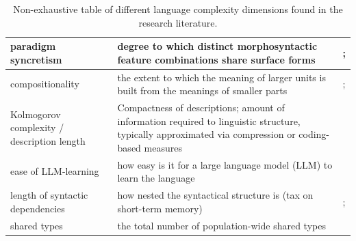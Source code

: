 \documentclass[USenglish]{article}
\providecommand{\DIFdelbegin}{} %
\providecommand{\DIFscaledelfig}{0.5}
\newlength{\DIFdelgraphicswidth} %
\newlength{\DIFdelgraphicsheight} %
\providecommand{\DIFdelincludegraphics}[2][]{%
\sbox{\DIFdelgraphicsbox}{\DIFOincludegraphics[#1]{#2}}%
\settoboxwidth{\DIFdelgraphicswidth}{\DIFdelgraphicsbox} %
\settoboxtotalheight{\DIFdelgraphicsheight}{\DIFdelgraphicsbox} %
\scalebox{\DIFscaledelfig}{%
\parbox[b]{\DIFdelgraphicswidth}{\usebox{\DIFdelgraphicsbox}\\[-\baselineskip] \rule{\DIFdelgraphicswidth}{0em}}\llap{\resizebox{\DIFdelgraphicswidth}{\DIFdelgraphicsheight}{%
\setlength{\unitlength}{\DIFdelgraphicswidth}%
\begin{picture}(1,1)%
\thicklines\linethickness{2pt} %
{\color[rgb]{1,0,0}\put(0,0){\framebox(1,1){}}}%
{\color[rgb]{1,0,0}\put(0,0){\line( 1,1){1}}}%
{\color[rgb]{1,0,0}\put(0,1){\line(1,-1){1}}}%
\end{picture}%
}\hspace*{3pt}}} %
} %
\DeclareRobustCommand{\DIFdelbegin}{\DIFOdelbegin \let\includegraphics\DIFdelincludegraphics} %
\begin{document}
\begin{table}[ht]
\begin{tabular}{p{2.2cm}p{4cm}p{6cm}}
paradigm syncretism &  degree to which distinct morphosyntactic feature combinations share surface forms & \citet{quinn_evolutionary_2025}; \citet{bonami_joint_2016}  \\    \midrule
compositionality  & the extent to which the meaning of larger units is built from the meanings of smaller parts &  \cite{wraygrace2007}; \citet{lindsay-smith_analogy_2024} \\  \midrule
Kolmogorov complexity / description length & Compactness of descriptions; amount of information required to linguistic structure, typically approximated via compression or coding-based measures &  \cite{kolmogorov_three_1965, juola1998measuring, dahl2004growth, aceves2024human,  sagot_comparing_2013, ehret_information-theoretic_2016}  \\    \midrule
ease of LLM-learning  & how easy is it for a large language model (LLM) to learn the language &  \cite{koplenig2023languages}  \\    \midrule
length of syntactic dependencies  &  how nested the syntactical structure is (tax on short-term memory) & \cite{gibson1998linguistic}; \citet{liu2008dependency} \\    
\midrule
shared types & the total number of population-wide shared types &  \citet{spike2017population}\\
\bottomrule
    \end{tabular}
    \caption{Non-exhaustive table of different language complexity dimensions found in the research literature.}
    \label{tab:complex_metrics}
\end{table}

\DIFdelbegin %
\end{document}
